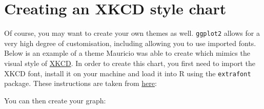 \section{Creating an XKCD style
chart}\label{creating-an-xkcd-style-chart}

Of course, you may want to create your own themes as well.
\texttt{ggplot2} allows for a very high degree of customisation,
including allowing you to use imported fonts. Below is an example of a
theme Mauricio was able to create which mimics the visual style of
\href{http://xkcd.com/}{XKCD}. In order to create this chart, you first
need to import the XKCD font, install it on your machine and load it
into R using the \texttt{extrafont} package. These instructions are
taken from
\href{https://www.google.com.au/url?sa=t\&rct=j\&q=\&esrc=s\&source=web\&cd=1\&ved=0ahUKEwiWzafchdPJAhVBpJQKHe_LDT8QFggbMAA\&url=https\%3A\%2F\%2Fcran.r-project.org\%2Fweb\%2Fpackages\%2Fxkcd\%2Fvignettes\%2Fxkcd-intro.pdf\&usg=AFQjCNE-KciGY14e-Q1buYIVmTFC0ht__Q\&sig2=DZUwkvIHwfNWtTtkcz94jg}{here}:

\begin{Shaded}
\begin{Highlighting}[]

\NormalTok{(}\NormalTok{, }
\StringTok{      }\NormalTok{, }\NormalTok{)}
\NormalTok{(}\NormalTok{)}
\NormalTok{(}\NormalTok{)}
\NormalTok{(} \NormalTok{, }\NormalTok{)}
\NormalTok{()}
\NormalTok{()}
\end{Highlighting}
\end{Shaded}

You can then create your graph:

